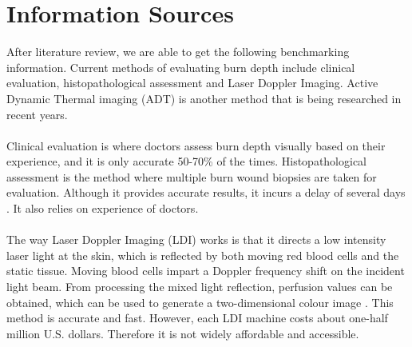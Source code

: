 \documentclass[paper=letter, fontsize=11pt]{scrartcl}
\numberwithin{equation}{section}		%
\numberwithin{figure}{section}			%
\numberwithin{table}{section}			%
\begin{document}
\section{Information Sources}
After literature review, we are able to get the following benchmarking information. Current methods of evaluating burn depth
include clinical evaluation, histopathological assessment and Laser Doppler Imaging. Active Dynamic Thermal imaging (ADT) is
another method that is being researched in recent years.\\
\\
Clinical evaluation is where doctors
assess burn depth visually based on their experience, and it is only accurate 50-70\% of the times.
Histopathological assessment is the method where multiple burn wound biopsies are taken for evaluation. Although it provides
accurate results, it incurs a delay of several days \cite{Renkielska}. It also relies on experience of doctors.\\
\\
The way Laser Doppler Imaging (LDI) works is that it directs a low intensity laser light at the skin, 
which is reflected by both moving red blood cells and the static tissue. Moving blood cells impart a Doppler frequency shift 
on the incident light beam. From processing the mixed light reflection, perfusion values can be obtained, which can be used 
to generate a two-dimensional colour image \cite{Pape}. This method is accurate and fast. 
However, each LDI machine costs about one-half million U.S. dollars. Therefore it is not widely affordable and accessible.
\end{document}

